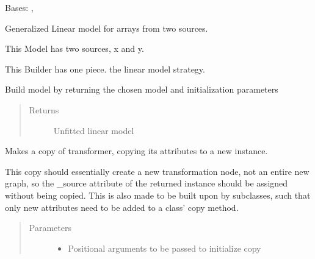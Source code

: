 \documentclass[letterpaper,10pt,english]{sphinxmanual}
\begin{document}
\begin{fulllineitems}
\label{\detokenize{dalio.model:dalio.model.XYLinearModel}}
Bases: {\hyperref[\detokenize{dalio.model:dalio.model.model.Model}]{}}, 

Generalized Linear model for arrays from two sources.

This Model has two sources, x and y.

This Builder has one piece. the linear model strategy.

\begin{fulllineitems}
\label{\detokenize{dalio.model:dalio.model.XYLinearModel.build_model}}
Build model by returning the chosen model and initialization
parameters
\begin{quote}\begin{description}
\item[{Returns}] \leavevmode
Unfitted linear model

\end{description}\end{quote}

\end{fulllineitems}


\begin{fulllineitems}
\label{\detokenize{dalio.model:dalio.model.XYLinearModel.copy}}
Makes a copy of transformer, copying its attributes to a new
instance.

This copy should essentially create a new transformation node, not an
entire new graph, so the \_source attribute of the returned instance
should be assigned without being copied. This is also made to be built
upon by subclasses, such that only new attributes need to be added to
a class’ copy method.
\begin{quote}\begin{description}
\item[{Parameters}] \leavevmode\begin{itemize}
\item {} 
 \textendash{} Positional arguments to be passed to initialize copy


\end{itemize}
\end{description}
\end{quote}
\end{fulllineitems}
\end{fulllineitems}
\end{document}
